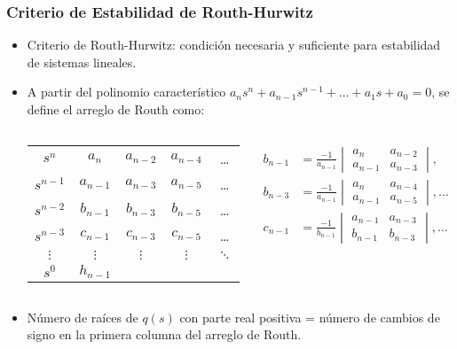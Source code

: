 \documentclass[aspectratio=169,handout]{beamer}
\theoremstyle{definition}
\theoremstyle{plain}
\theoremstyle{remark}
\begin{document}
\begin{frame}[<+->]\frametitle{Criterio de Estabilidad de Routh-Hurwitz}
\begin{itemize}
	\item Criterio de Routh-Hurwitz: condición necesaria y suficiente para estabilidad de sistemas lineales.
	\item A partir del polinomio característico $a_n s^n + a_{n-1} s^{n-1} + \dots + a_1 s + a_0 = 0$, se define el arreglo de Routh como:
	\vspace{-5mm}
	\begin{columns}
	\begin{column}{0.5\textwidth}
	\begin{tabular}{c|cccc}
		$s^n$     & $a_n$     & $a_{n-2}$ & $a_{n-4}$ & \dots\\
		$s^{n-1}$ & $a_{n-1}$ & $a_{n-3}$ & $a_{n-5}$ & \dots\\
		$s^{n-2}$ & $b_{n-1}$ & $b_{n-3}$ & $b_{n-5}$ & \dots\\
		$s^{n-3}$ & $c_{n-1}$ & $c_{n-3}$ & $c_{n-5}$ & \dots\\
		$\vdots$ & $\vdots$ & $\vdots$ & $\vdots$ & $\ddots$\\
		$s^0$ & $h_{n-1}$ & & & 
	\end{tabular}
	\end{column}
	\begin{column}{0.5\textwidth}
	\begin{align*}
		b_{n-1} &= \frac{-1}{a_{n-1}}
		\begin{vmatrix}
			a_n     & a_{n-2}\\
			a_{n-1} & a_{n-3}
		\end{vmatrix},\\
		b_{n-3} &= \frac{-1}{a_{n-1}}
		\begin{vmatrix}
			a_n     & a_{n-4}\\
			a_{n-1} & a_{n-5}
		\end{vmatrix}, \dots\\
		c_{n-1} &= \frac{-1}{b_{n-1}}
		\begin{vmatrix}
			a_{n-1} & a_{n-3}\\
			b_{n-1} & b_{n-3}
		\end{vmatrix}, \dots\\
	\end{align*}
	\end{column}
	\end{columns}
	\vspace{-5mm}
	\item Número de raíces de $q(s)$ con parte real positiva = número de cambios de signo en la primera columna del arreglo de Routh.
\end{itemize}
\end{frame}
\end{document}
